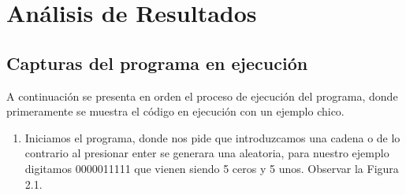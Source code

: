 \chapter{Análisis de Resultados}
\section{Capturas del programa en ejecución}

A continuación se presenta en orden el proceso de ejecución del programa, donde primeramente se muestra el código en ejecución con un ejemplo chico.\newline
\newpage

\begin{enumerate}
\item Iniciamos el programa, donde nos pide que introduzcamos una cadena o de lo contrario al presionar enter se generara una aleatoria, para nuestro ejemplo digitamos 0000011111 que vienen siendo 5 ceros y 5 unos. Observar la Figura 2.1.


\end{enumerate}
